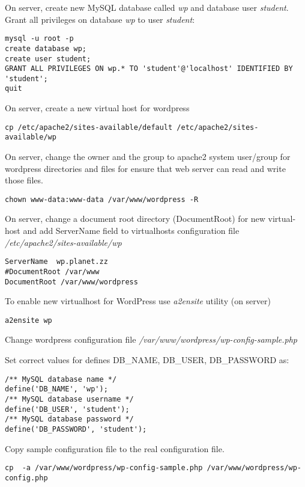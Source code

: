 On server, create new \gls{MySQL} database called \emph{wp} and database user \emph{student}. Grant all privileges on database \emph{wp} to user \emph{student}:

\begin{verbatim}
mysql -u root -p
create database wp;
create user student;
GRANT ALL PRIVILEGES ON wp.* TO 'student'@'localhost' IDENTIFIED BY 'student';
quit
\end{verbatim}

On server, create a new virtual host for wordpress 

\begin{verbatim}
cp /etc/apache2/sites-available/default /etc/apache2/sites-available/wp
\end{verbatim}

On server, change the owner and the group to apache2 system user/group for wordpress directories and files for ensure that web server can read and write those files.
\begin{verbatim}
chown www-data:www-data /var/www/wordpress -R
\end{verbatim}

On server, change a document root directory (DocumentRoot) for new virtual-host and add ServerName field to virtualhosts configuration file \emph{/etc/apache2/sites-available/wp}


\begin{verbatim}
ServerName	wp.planet.zz
#DocumentRoot /var/www
DocumentRoot /var/www/wordpress
\end{verbatim}


To enable new virtualhost for WordPress use \emph{a2ensite} utility (on server)
\begin{verbatim}
a2ensite wp
\end{verbatim}

Change wordpress configuration file
\emph{/var/www/wordpress/wp-config-sample.php}

Set correct values for defines DB\_NAME, DB\_USER, DB\_PASSWORD as:
\begin{verbatim}
/** MySQL database name */
define('DB_NAME', 'wp');
/** MySQL database username */
define('DB_USER', 'student');
/** MySQL database password */
define('DB_PASSWORD', 'student');
\end{verbatim}

Copy sample configuration file to the real configuration file.
\begin{verbatim}
cp  -a /var/www/wordpress/wp-config-sample.php /var/www/wordpress/wp-config.php
\end{verbatim}


